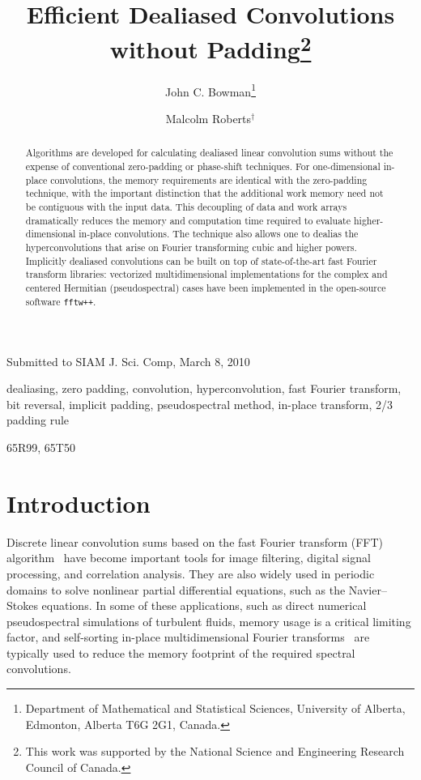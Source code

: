 \documentclass[final]{siamltex}
\begin{document}
\title{Efficient Dealiased Convolutions without Padding\thanks{This work
was supported by the National Science and Engineering Research Council of
Canada.}}
\author{John C. Bowman\thanks{Department of Mathematical and Statistical
Sciences, University of Alberta, Edmonton, Alberta T6G 2G1, Canada.}
\and Malcolm Roberts$^\dagger$}

\maketitle

{\centerline {Submitted to SIAM J. Sci. Comp, March 8, 2010}}

\begin{abstract}
Algorithms are developed for calculating dealiased linear convolution sums
without the expense of conventional zero-padding or phase-shift
techniques. For one-dimensional in-place convolutions, the memory
requirements are identical with the zero-padding technique, with the important
distinction that the additional work memory need not be contiguous with the
input data. This decoupling of data and work arrays dramatically reduces
the memory and computation time required to evaluate higher-dimensional
in-place convolutions. The technique also allows one to dealias the
hyperconvolutions that arise on Fourier transforming cubic and higher powers.
Implicitly dealiased convolutions can be built on top of state-of-the-art
fast Fourier transform libraries: vectorized multidimensional implementations
for the complex and centered Hermitian (pseudospectral) cases have
been implemented in the open-source software {\tt fftw++}.
\end{abstract} 

\begin{keywords} 
dealiasing, zero padding, convolution, hyperconvolution,
fast Fourier transform, bit reversal, implicit padding, pseudospectral method,
in-place transform, 2/3 padding rule
\end{keywords}

\begin{AMS}
65R99, 65T50
\end{AMS}

\pagestyle{myheadings}



\section{Introduction}
Discrete linear convolution sums based on the fast Fourier transform
(FFT) algorithm~\cite{Gauss1866,Cooley65} have become important tools
for image filtering, digital signal processing, and correlation
analysis. They are also widely used in periodic domains to solve
nonlinear partial differential equations, such as the Navier--Stokes
equations. In some of these applications, such as
direct numerical pseudospectral simulations of turbulent fluids,
memory usage is a critical limiting factor, and self-sorting in-place
multidimensional Fourier transforms~\cite{Temperton91} are typically used to
reduce the memory footprint of the required spectral convolutions.
\end{document}
